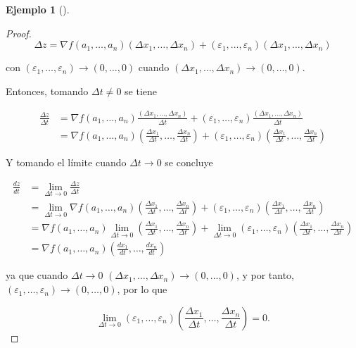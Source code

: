 \documentclass[
  a4paper,
]{scrreport}
\theoremstyle{definition}
\newtheorem{example}{Ejemplo}[chapter]
\theoremstyle{plain}
\theoremstyle{definition}
\theoremstyle{definition}
\theoremstyle{plain}
\theoremstyle{plain}
\theoremstyle{remark}
\begin{document}
\begin{example}[]
\begin{tcolorbox}
\begin{proof}
\[
\Delta z = \nabla f(a_1,\ldots,a_n) (\Delta x_1,\ldots, \Delta x_n) + (\varepsilon_1,\ldots, \varepsilon_n)(\Delta x_1,\ldots, \Delta x_n)
\]

con \((\varepsilon_1,\ldots,\varepsilon_n) \to (0,\ldots,0)\) cuando
\((\Delta x_1, \ldots, \Delta x_n) \to (0,\ldots,0)\).

Entonces, tomando \(\Delta t\neq 0\) se tiene

\begin{align*}
\frac{\Delta z}{\Delta t}
&= \nabla f(a_1,\ldots,a_n) \frac{(\Delta x_1,\ldots, \Delta x_n)}{\Delta t} + (\varepsilon_1,\ldots, \varepsilon_n) \frac{(\Delta x_1,\ldots, \Delta x_n)}{\Delta t} \\
&= \nabla f(a_1,\ldots,a_n) \left(\frac{\Delta x_1}{\Delta t},\ldots, \frac{\Delta x_n}{\Delta t}\right) + (\varepsilon_1,\ldots, \varepsilon_n) \left(\frac{\Delta x_1}{\Delta t},\ldots, \frac{\Delta x_n}{\Delta t}\right)
\end{align*}

Y tomando el límite cuando \(\Delta t \to 0\) se concluye

\begin{align*}
\frac{dz}{dt} &=
\lim_{\Delta t\to 0}\frac{\Delta z}{\Delta t} \\
&= \lim_{\Delta t\to 0} \nabla f(a_1,\ldots,a_n) \left(\frac{\Delta x_1}{\Delta t},\ldots, \frac{\Delta x_n}{\Delta t}\right) + (\varepsilon_1,\ldots, \varepsilon_n) \left(\frac{\Delta x_1}{\Delta t},\ldots, \frac{\Delta x_n}{\Delta t}\right) \\
&= \nabla f(a_1,\ldots,a_n)  \lim_{\Delta t\to 0}\left(\frac{\Delta x_1}{\Delta t},\ldots, \frac{\Delta x_n}{\Delta t}\right) + \lim_{\Delta t \to 0}(\varepsilon_1,\ldots, \varepsilon_n) \left(\frac{\Delta x_1}{\Delta t},\ldots, \frac{\Delta x_n}{\Delta t}\right) \\
&= \nabla f(a_1,\ldots,a_n) \left(\frac{dx_1}{dt},\ldots, \frac{dx_n}{dt}\right)
\end{align*}

ya que cuando \(\Delta t \to 0\)
\((\Delta x_1, \ldots, \Delta x_n) \to (0,\ldots,0)\), y por tanto,
\((\varepsilon_1,\ldots,\varepsilon_n) \to (0,\ldots,0)\), por lo que

\[
\lim_{\Delta t\to  0} (\varepsilon_1,\ldots, \varepsilon_n) \left(\frac{\Delta x_1}{\Delta t},\ldots, \frac{\Delta x_n}{\Delta t}\right) = 0.
\]
\end{proof}

\end{tcolorbox}


\end{example}
\end{document}
